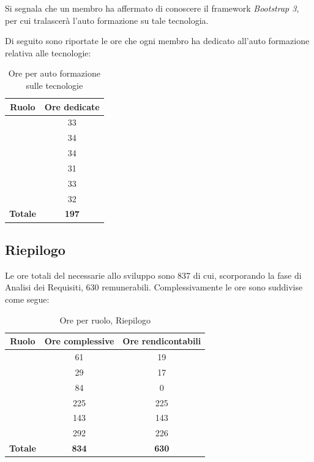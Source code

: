 Si segnala che un membro ha affermato di conoscere il framework \textit{Bootstrap 3}, per cui tralascerà l'auto formazione su tale tecnologia.

Di seguito sono riportate le ore che ogni membro ha dedicato all'auto formazione relativa alle tecnologie:

\begin{table}[H]
	\begin{center}
		\begin{tabular}{|c|c|}
			\hline
			\textbf{Ruolo}	& \textbf{Ore dedicate}  \\
			\hline
			\MC	&	33		\\
			\hline
			\DAN	&	34	\\
			\hline
			\AN	&	34		\\
			\hline
			\AS	&	31		\\
			\hline
			\NS	&	33		\\
			\hline
			\DS	&	32		\\
			\hline
			\textbf{Totale} & \textbf{197}  \\
			\hline
		\end{tabular}
	\end{center}
	\caption{Ore per auto formazione sulle tecnologie}
\end{table}


\subsection{Riepilogo}
Le ore totali del necessarie allo sviluppo sono 837 di cui, scorporando la fase di Analisi dei Requisiti, 630 remunerabili. Complessivamente le ore sono suddivise come segue:

\begin{table}[H]
	\begin{center}
		\begin{tabular}{|c|c|c|}
			\hline
			\textbf{Ruolo}	& \textbf{Ore complessive} & \textbf{Ore rendicontabili} \\
			\hline
			\Res	&	61	&	19	\\
			\hline
			\Amm	&	29	&	17	\\
			\hline
			\Ana	&	84	&	0	\\
			\hline
			\Prog	&	225	&	225	\\
			\hline
			\Progr	&	143	&	143	\\
			\hline
			\Ver	&	292	&	226	\\
			\hline
			\textbf{Totale} & \textbf{834} & \textbf{630} \\
			\hline
		\end{tabular}
	\end{center}
	\caption{Ore per ruolo, Riepilogo}
\end{table}

